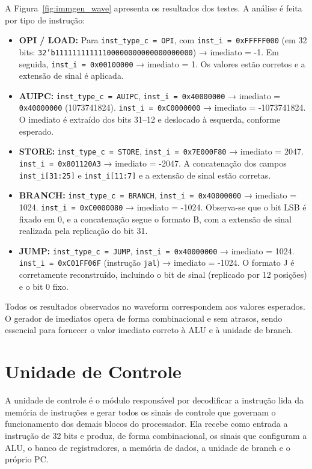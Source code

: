 \documentclass[
	12pt,				%
	oneside,
	a4paper,			%
	english,			%
	french,				%
	spanish,			%
	brazil,				%
	]{abntex2}
\begin{document}
A Figura~\ref{fig:immgen_wave} apresenta os resultados dos testes. A análise é feita por tipo de instrução:

\begin{itemize}
  \item \textbf{OPI / LOAD:}  
    Para \texttt{inst\_type\_c = OPI}, com \texttt{inst\_i = 0xFFFFF000} (em 32 bits: \texttt{32'b11111111111100000000000000000000}) → imediato = -1.  
    Em seguida, \texttt{inst\_i = 0x00100000} → imediato = 1. Os valores estão corretos e a extensão de sinal é aplicada.

  \item \textbf{AUIPC:}  
    \texttt{inst\_type\_c = AUIPC}, \texttt{inst\_i = 0x40000000} → imediato = \texttt{0x40000000} (1073741824).  
    \texttt{inst\_i = 0xC0000000} → imediato = -1073741824. O imediato é extraído dos bits 31–12 e deslocado à esquerda, conforme esperado.

  \item \textbf{STORE:}  
    \texttt{inst\_type\_c = STORE}, \texttt{inst\_i = 0x7E000F80} → imediato = 2047.  
    \texttt{inst\_i = 0x801120A3} → imediato = -2047. A concatenação dos campos \texttt{inst\_i[31:25]} e \texttt{inst\_i[11:7]} e a extensão de sinal estão corretas.

  \item \textbf{BRANCH:}  
    \texttt{inst\_type\_c = BRANCH}, \texttt{inst\_i = 0x40000000} → imediato = 1024.  
    \texttt{inst\_i = 0xC0000080} → imediato = -1024. Observa-se que o bit LSB é fixado em 0, e a concatenação segue o formato B, com a extensão de sinal realizada pela replicação do bit 31.

  \item \textbf{JUMP:}  
    \texttt{inst\_type\_c = JUMP}, \texttt{inst\_i = 0x40000000} → imediato = 1024.  
    \texttt{inst\_i = 0xC01FF06F} (instrução \texttt{jal}) → imediato = -1024. O formato J é corretamente reconstruído, incluindo o bit de sinal (replicado por 12 posições) e o bit 0 fixo.
\end{itemize}

Todos os resultados observados no waveform correspondem aos valores esperados. O gerador de imediatos opera de forma combinacional e sem atrasos, sendo essencial para fornecer o valor imediato correto à ALU e à unidade de branch.
\section{Unidade de Controle}

A unidade de controle é o módulo responsável por decodificar a instrução lida da memória de instruções e gerar todos os sinais de controle que governam o funcionamento dos demais blocos do processador. Ela recebe como entrada a instrução de 32 bits e produz, de forma combinacional, os sinais que configuram a ALU, o banco de registradores, a memória de dados, a unidade de branch e o próprio PC.
\end{document}

